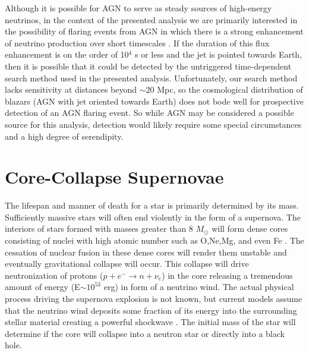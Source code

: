 \documentclass{gatech-thesis}
\begin{document}
Although it is possible for AGN to serve as steady sources of high-energy neutrinos, in the context of the presented analysis we are primarily interested in the possibility of flaring events from AGN in which there is a strong enhancement of neutrino production over short timescales \cite{1997ARA&A..35..445U}. If the duration of this flux enhancement is on the order of 10$^4$ s or less and the jet is pointed towards Earth, then it is possible that it could be detected by the untriggered time-dependent search method used in the presented analysis. Unfortunately, our search method lacks sensitivity at distances beyond $\sim 20$ Mpc, so the cosmological distribution of blazars (AGN with jet oriented towards Earth) does not bode well for prospective detection of an AGN flaring event. So while AGN may be considered a possible source for this analysis, detection would likely require some special circumstances and a high degree of serendipity.

\section{Core-Collapse Supernovae}
The lifespan and manner of death for a star is primarily determined by its mass. Sufficiently massive stars will often end violently in the form of a supernova. The interiors of stars formed with masses greater than 8 $M_{\odot}$ will form dense cores consisting of nuclei with high atomic number such as O,Ne,Mg, and even Fe \cite{2003astro.ph..1006H}. The cessation of nuclear fusion in these dense cores will render them unstable and eventually gravitational collapse will occur. This collapse will drive neutronization of protons ($p+e^{-} \rightarrow n + \nu_e$) in the core releasing a tremendous amount of energy (E$\sim 10^{53}$ erg) in form of a neutrino wind. The actual physical process driving the supernova explosion is not known, but current models assume that the neutrino wind deposits some fraction of its energy into the surrounding stellar material creating a powerful shockwave \cite{2003astro.ph..1006H}. The initial mass of the star will determine if the core will collapse into a neutron star or directly into a black hole.
\end{document}
